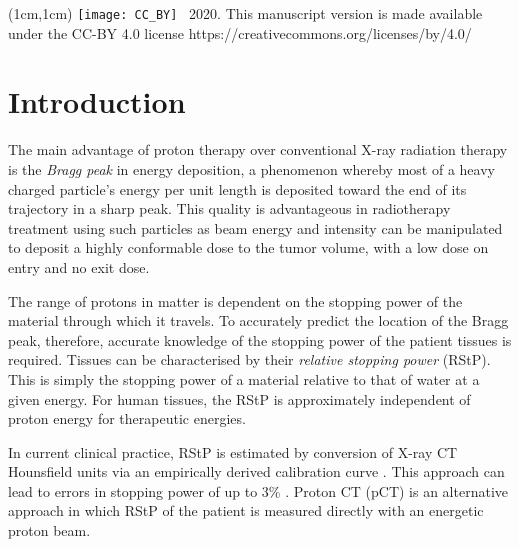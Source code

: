 \documentclass[preprint,times]{elsarticle}
\begin{document}
\maketitle

%
%

\begin{textblock*}{20cm}(1cm,1cm) %
   \footnotesize \texttt{[image: CC\_BY]} \textcopyright \ 2020. This manuscript version is made available under the CC-BY 4.0 license https://creativecommons.org/licenses/by/4.0/
\end{textblock*}


\section{Introduction}

The main advantage of proton therapy over conventional X-ray radiation therapy is the \emph{Bragg peak} in energy deposition, a phenomenon whereby most of a heavy charged particle's energy per unit length is deposited toward the end of its trajectory in a sharp peak. This quality is advantageous in radiotherapy treatment using such particles as beam energy and intensity can be manipulated to deposit a highly conformable dose to the tumor volume, with a low dose on entry and no exit dose.

The range of protons in matter is dependent on the stopping power of the material through which it travels. To accurately predict the location of the Bragg peak, therefore, accurate knowledge of the stopping power of the patient tissues is required. Tissues can be characterised by their \emph{relative stopping power} (RStP). This is simply the stopping power of a material relative to that of water at a given energy. For human tissues, the RStP is approximately independent of proton energy for therapeutic energies.

In current clinical practice, RStP is estimated by conversion of X-ray CT Hounsfield units via an empirically derived calibration curve \citep{schneideretal}. This approach can lead to errors in stopping power of up to 3\% \citep{smith,jiang}. Proton CT (pCT) is an alternative approach in which RStP of the patient is measured directly with an energetic proton beam.
\end{document}
